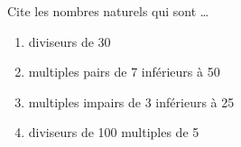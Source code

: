%
%
    Cite les nombres naturels qui sont \dots
    \begin{enumerate}[cols=2]
        \item diviseurs de 30
        \item multiples pairs de 7 inférieurs à 50
        \item multiples impairs de 3 inférieurs à 25
        \item diviseurs de 100 multiples de 5
    \end{enumerate}
